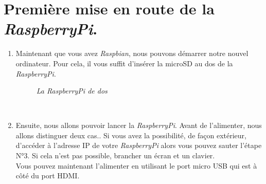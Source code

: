 \section{Première mise en route de la \textit{RaspberryPi}.}

\begin{enumerate}

	\item Maintenant que vous avez \textit{Raspbian}, nous pouvons démarrer notre nouvel ordinateur.
Pour cela, il vous suffit d'insérer la microSD au dos de la \textit{RaspberryPi}.\\
\begin{figure}[H]
\begin{center}
\end{center}
	\caption{ \textit{La \textit{RaspberryPi} de dos}}
\end{figure}\\

	\item Ensuite, nous allons pouvoir lancer la \textit{RaspberryPi}. Avant de l'alimenter, nous allons distinguer deux cas.. Si vous avez la possibilité, de façon extérieur, d'accéder à l'adresse IP de votre \textit{RaspberryPi} alors vous pouvez sauter l'étape N°3. Si cela n'est pas possible, brancher un écran et un clavier.\\
	Vous pouvez maintenant l'alimenter en utilisant le port micro USB qui est à côté du port HDMI.\\
	

\end{enumerate}
